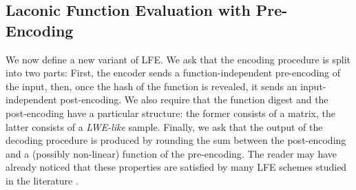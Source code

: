 \documentclass{article}
\begin{document}
\subsection{Laconic Function Evaluation with Pre-Encoding}

We now define a new variant of LFE. We ask that the encoding procedure is split into two parts: First, the encoder sends a function-independent pre-encoding of the input, then, once the hash of the function is revealed, it sends an input-independent post-encoding. We also require that the function digest and the post-encoding have a particular structure: the former consists of a matrix, the latter consists of a \emph{LWE-like} sample. Finally, we ask that the output of the decoding procedure is produced by rounding the sum between the post-encoding and a (possibly non-linear) function of the pre-encoding. The reader may have already noticed that these properties are satisfied by many LFE schemes studied in the literature \cite{FOCS:QuaWeeWic18,FOCS:HsiLinLuo23,C:DHMWW24,C:Wee24}.
\end{document}
